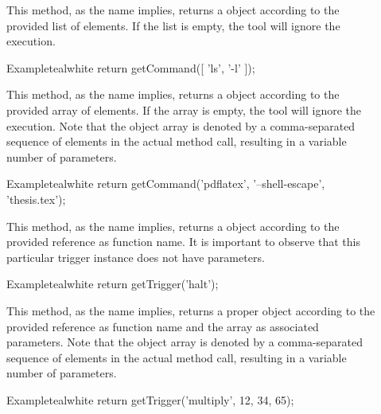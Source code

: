 \begin{description}
\item[] This method, as the name implies, returns a  object according to the provided list of  elements. If the list is empty, the tool will ignore the execution.

\begin{codebox}{Example}{teal}{\icnote}{white}
return getCommand([ 'ls', '-l' ]);
\end{codebox}

\item[] This method, as the name implies, returns a  object according to the provided array of  elements. If the array is empty, the tool will ignore the execution. Note that the object array is denoted by a comma-separated sequence of elements in the actual method call, resulting in a variable number of parameters.

\begin{codebox}{Example}{teal}{\icnote}{white}
return getCommand('pdflatex', '--shell-escape', 'thesis.tex');
\end{codebox}

\item[] This method, as the name implies, returns a  object according to the provided  reference as function name. It is important to observe that this particular trigger instance does not have parameters.

\begin{codebox}{Example}{teal}{\icnote}{white}
return getTrigger('halt');
\end{codebox}

\item[] This method, as the name implies, returns a proper  object according to the provided  reference as function name and the  array as associated parameters. Note that the object array is denoted by a comma-separated sequence of elements in the actual method call, resulting in a variable number of parameters.

\begin{codebox}{Example}{teal}{\icnote}{white}
return getTrigger('multiply', 12, 34, 65);
\end{codebox}


\end{description}
